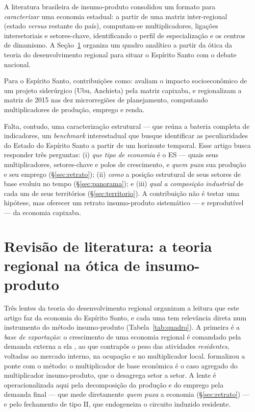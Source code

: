 \documentclass[11pt,a4paper]{article}
\begin{document}
A literatura brasileira de insumo-produto consolidou um formato para \emph{caracterizar}
uma economia estadual: a partir de uma matriz inter-regional (estado \emph{versus}
restante do país), computam-se multiplicadores, ligações intersetoriais e
setores-chave, identificando o perfil de especialização e os centros de dinamismo.
A Seção~\ref{sec:quadro} organiza um quadro analítico a partir da ótica da teoria do desenvolvimento regional para situar o Espírito Santo com o debate nacional.

Para o Espírito Santo, contribuições como: \citet{sessa2017ubu} avaliam o impacto socioeconômico de um projeto siderúrgico (Ubu, Anchieta) pela matriz capixaba, e \citet{ribeiro2024dinamica}
regionalizam a matriz de 2015 nas dez microrregiões de planejamento, computando
multiplicadores de produção, emprego e renda. 

Falta, contudo, uma caracterização
estrutural --- que reúna a bateria completa de indicadores, um \emph{benchmark}
interestadual que busque identificar as peculiaridades do Estado do Espírito Santo a partir de um horizonte temporal.
Esse artigo busca responder três perguntas: (i) \emph{que tipo de economia} é o ES ---
quais seus multiplicadores, setores-chave e polos de crescimento, e \emph{quem puxa}
sua produção e seu emprego (\S\ref{sec:retrato});
(ii) \emph{como} a posição estrutural de seus setores de base evoluiu no tempo
(\S\ref{sec:panorama}); e (iii) \emph{qual a composição industrial} de cada um de seus territórios
(\S\ref{sec:territorio}). A contribuição não é testar uma hipótese, mas oferecer um
retrato insumo-produto sistemático --- e reprodutível --- da economia capixaba.

\section{Revisão de literatura: a teoria regional na ótica de insumo-produto}
\label{sec:quadro}
Três lentes da teoria do desenvolvimento regional organizam a leitura que este artigo faz
da economia do Espírito Santo, e cada uma tem relevância direta num instrumento do método
insumo-produto (Tabela~\ref{tab:quadro}). A primeira é a \emph{base de exportação}: o
crescimento de uma economia regional é comandado pela demanda externa a ela
\citep{north1955}, ao que \citet{tiebout1956} contrapôs o peso das atividades
\emph{residentes}, voltadas ao mercado interno, na ocupação e no multiplicador local.
\citet{richardson1985} formalizou a ponte com o método: o multiplicador de base econômica
é o caso agregado do multiplicador insumo-produto, que o desagrega setor a setor. A lente
é operacionalizada aqui pela decomposição da produção e do emprego pela demanda final ---
que mede diretamente \emph{quem puxa} a economia (\S\ref{sec:retrato}) --- e pelo
fechamento de tipo II, que endogeneiza o circuito induzido residente.
\end{document}
